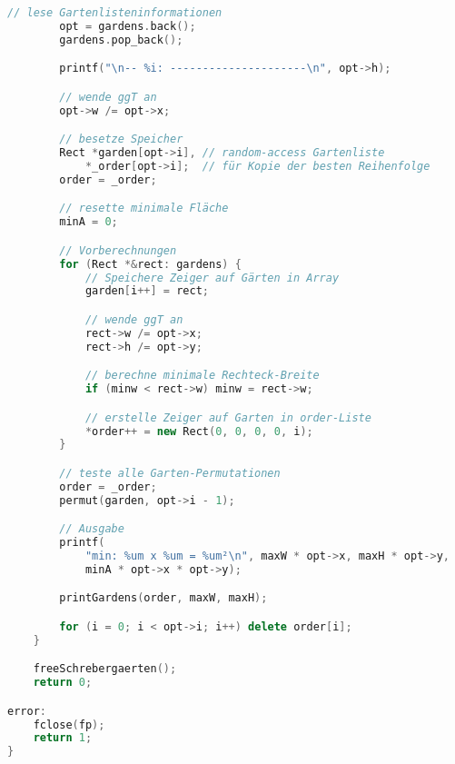 \documentclass[a4paper,10pt,ngerman]{scrartcl}
\begin{document}
\begin{lstlisting}[language=C++]
        // lese Gartenlisteninformationen
        opt = gardens.back();
        gardens.pop_back();

        printf("\n-- %i: ---------------------\n", opt->h);

        // wende ggT an
        opt->w /= opt->x;

        // besetze Speicher
        Rect *garden[opt->i], // random-access Gartenliste
            *_order[opt->i];  // für Kopie der besten Reihenfolge
        order = _order;

        // resette minimale Fläche
        minA = 0;

        // Vorberechnungen
        for (Rect *&rect: gardens) {
            // Speichere Zeiger auf Gärten in Array
            garden[i++] = rect;

            // wende ggT an
            rect->w /= opt->x;
            rect->h /= opt->y;

            // berechne minimale Rechteck-Breite
            if (minw < rect->w) minw = rect->w;

            // erstelle Zeiger auf Garten in order-Liste
            *order++ = new Rect(0, 0, 0, 0, i);
        }

        // teste alle Garten-Permutationen
        order = _order;
        permut(garden, opt->i - 1);

        // Ausgabe
        printf(
            "min: %um x %um = %um²\n", maxW * opt->x, maxH * opt->y,
            minA * opt->x * opt->y);

        printGardens(order, maxW, maxH);

        for (i = 0; i < opt->i; i++) delete order[i];
    }

    freeSchrebergaerten();
    return 0;

error:
    fclose(fp);
    return 1;
}


\end{lstlisting}
\end{document}
